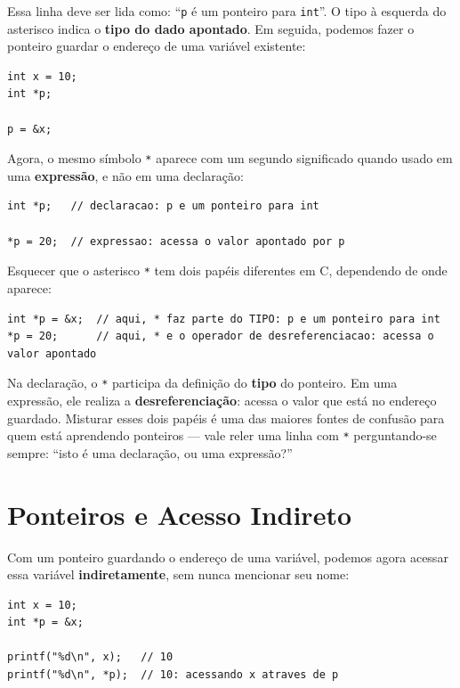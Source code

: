 Essa linha deve ser lida como: ``\texttt{p} é um ponteiro para \texttt{int}''. O tipo à esquerda do asterisco indica o \textbf{tipo do dado apontado}. Em seguida, podemos fazer o ponteiro guardar o endereço de uma variável existente:

\begin{lstlisting}
int x = 10;
int *p;

p = &x;
\end{lstlisting}

Agora, o mesmo símbolo \texttt{*} aparece com um segundo significado quando usado em uma \textbf{expressão}, e não em uma declaração:

\begin{lstlisting}
int *p;   // declaracao: p e um ponteiro para int

*p = 20;  // expressao: acessa o valor apontado por p
\end{lstlisting}

\begin{errocomum}
Esquecer que o asterisco \texttt{*} tem dois papéis diferentes em C, dependendo de onde aparece:
\begin{lstlisting}
int *p = &x;  // aqui, * faz parte do TIPO: p e um ponteiro para int
*p = 20;      // aqui, * e o operador de desreferenciacao: acessa o valor apontado
\end{lstlisting}
Na declaração, o \texttt{*} participa da definição do \textbf{tipo} do ponteiro. Em uma expressão, ele realiza a \textbf{desreferenciação}: acessa o valor que está no endereço guardado. Misturar esses dois papéis é uma das maiores fontes de confusão para quem está aprendendo ponteiros — vale reler uma linha com \texttt{*} perguntando-se sempre: ``isto é uma declaração, ou uma expressão?''
\end{errocomum}

\section{Ponteiros e Acesso Indireto}

Com um ponteiro guardando o endereço de uma variável, podemos agora acessar essa variável \textbf{indiretamente}, sem nunca mencionar seu nome:

\begin{lstlisting}
int x = 10;
int *p = &x;

printf("%d\n", x);   // 10
printf("%d\n", *p);  // 10: acessando x atraves de p
\end{lstlisting}

